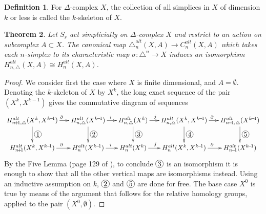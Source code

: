 \documentclass[11pt,a4paper,twoside]{article}
\theoremstyle{plain}
\newtheorem{thm}{Theorem}[subsection]
\theoremstyle{definition}
\newtheorem{defn}[thm]{Definition}
\theoremstyle{definition}
\theoremstyle{definition}
\theoremstyle{definition}
\theoremstyle{definition}
\newcommand*\circled[1]{\tikz[baseline=(char.base)]{
            \node[shape=circle,draw,inner sep=1pt] (char) {#1};}}
\begin{document}
\begin{defn}
For $\Delta$-complex $X$, the collection of all simplices in $X$ of dimension $k$ or less is called the $k$-skeleton of $X$.
\end{defn}

\begin{thm}\label{Thm:EquivalenceSimplicialSingular}
Let $S_r$ act simplicially on $\Delta$-complex $X$ and restrict to an action on subcomplex $A\subset X$. The canonical map $\triangle^{alt}_n(X,A)\!\longrightarrow\!C^{alt}_n(X,A)$ which takes each $n$-simplex to its characteristic map $\sigma\!:\!\triangle^n\rightarrow X$ induces an isomorphism $H^{alt}_{n,\triangle}(X,A)\cong H^{alt}_n(X,A)$.
\end{thm}
\begin{proof}
We consider first the case where $X$ is finite dimensional, and $A\!=\!\emptyset$. Denoting the $k$-skeleton of $X$ by $X^k$, the long exact sequence of the pair $(X^k,X^{k-1})$ gives the commutative diagram of sequences
\begin{displaymath}
\xymatrix@C=0.5cm{
    H^{alt}_{n\!+\!1,\triangle}(X^k,X^{k\!-\!1}) \ar[r]^{\,\,\,\partial} \ar[d]^{\circled{1}}   &   H^{alt}_{n,\triangle}(X^{k\!-\!1}) \ar[r]^i \ar[d]^{\circled{2}}  &   H^{alt}_{n,\triangle}(X^k) \ar[r]^{j\quad} \ar[d]^{\circled{3}}   &   H^{alt}_{n,\triangle}(X^k,X^{k\!-\!1}) \ar[r]^\partial \ar[d]^{\circled{4}}   &    H^{alt}_{n\!-\!1,\triangle}(X^{k\!-\!1}) \ar[d]^{\circled{5}}\\
    H^{alt}_{n\!+\!1}(X^k,X^{k\!-\!1}) \ar[r]^{\,\,\,\partial}  &   H^{alt}_{n}(X^{k\!-\!1}) \ar[r]^i   &   H^{alt}_{n}(X^k) \ar[r]^{j\quad}   &   H^{alt}_{n}(X^k,X^{k\!-\!1}) \ar[r]^\partial &  H^{alt}_{n\!-\!1}(X^{k\!-\!1}) 
    }
\end{displaymath}
By the Five Lemma (page 129 of \cite{algebraictopology}), to conclude $\circled{3}$ is an isomorphism it is enough to show that all the other vertical maps are isomorphisms instead. Using an inductive assumption on $k$, $\circled{2}$ and $\circled{5}$ are done for free. The base case $X^0$ is true by means of the argument that follows for the relative homology groups, applied to the pair $(X^0,\emptyset)$.


\end{proof}
\end{document}

